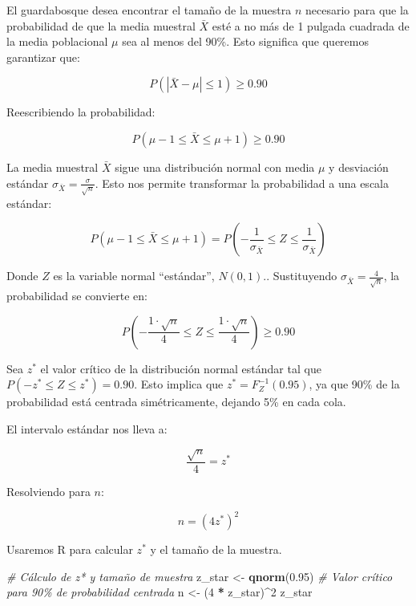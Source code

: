\documentclass[
]{article}
\newenvironment{Shaded}{\begin{snugshade}}{\end{snugshade}}
\newcommand{\CommentTok}[1]{\textcolor[rgb]{0.56,0.35,0.01}{\textit{#1}}}
\newcommand{\DecValTok}[1]{\textcolor[rgb]{0.00,0.00,0.81}{#1}}
\newcommand{\FloatTok}[1]{\textcolor[rgb]{0.00,0.00,0.81}{#1}}
\newcommand{\FunctionTok}[1]{\textcolor[rgb]{0.13,0.29,0.53}{\textbf{#1}}}
\newcommand{\NormalTok}[1]{#1}
\newcommand{\OtherTok}[1]{\textcolor[rgb]{0.56,0.35,0.01}{#1}}
\newcommand{\SpecialCharTok}[1]{\textcolor[rgb]{0.81,0.36,0.00}{\textbf{#1}}}
\begin{document}
El guardabosque desea encontrar el tamaño de la muestra \(n\) necesario para que la probabilidad de que la media muestral \(\bar{X}\) esté a no más de 1 pulgada cuadrada de la media poblacional \(\mu\) sea al menos del 90\%. Esto significa que queremos garantizar que:

\[
P(|\bar{X} - \mu| \leq 1) \geq 0.90
\]

Reescribiendo la probabilidad:

\[
P(\mu - 1 \leq \bar{X} \leq \mu + 1) \geq 0.90
\]

La media muestral \(\bar{X}\) sigue una distribución normal con media \(\mu\) y desviación estándar \(\sigma_{\bar{X}} = \frac{\sigma}{\sqrt{n}}\). Esto nos permite transformar la probabilidad a una escala estándar:

\[
P(\mu - 1 \leq \bar{X} \leq \mu + 1) = P\left(-\frac{1}{\sigma_{\bar{X}}} \leq Z \leq \frac{1}{\sigma_{\bar{X}}}\right)
\]

Donde \(Z\) es la variable normal ``estándar'', \(N(0,1)\).. Sustituyendo \(\sigma_{\bar{X}} = \frac{4}{\sqrt{n}}\), la probabilidad se convierte en:

\[
P\left(-\frac{1 \cdot \sqrt{n}}{4} \leq Z \leq \frac{1 \cdot \sqrt{n}}{4}\right) \geq 0.90
\]

Sea \(z^*\) el valor crítico de la distribución normal estándar tal que \(P(-z^* \leq Z \leq z^*) = 0.90\). Esto implica que \(z^* = F_Z^{-1}(0.95)\), ya que 90\% de la probabilidad está centrada simétricamente, dejando 5\% en cada cola.

El intervalo estándar nos lleva a:

\[
\frac{\sqrt{n}}{4} = z^*
\]

Resolviendo para \(n\):

\[
n = (4z^*)^2
\]

Usaremos R para calcular \(z^*\) y el tamaño de la muestra.

\begin{Shaded}
\begin{Highlighting}[]
\CommentTok{\# Cálculo de z* y tamaño de muestra}
\NormalTok{z\_star }\OtherTok{\textless{}{-}} \FunctionTok{qnorm}\NormalTok{(}\FloatTok{0.95}\NormalTok{) }\CommentTok{\# Valor crítico para 90\% de probabilidad centrada}
\NormalTok{n }\OtherTok{\textless{}{-}}\NormalTok{ (}\DecValTok{4} \SpecialCharTok{*}\NormalTok{ z\_star)}\SpecialCharTok{\^{}}\DecValTok{2}
\NormalTok{z\_star}
\end{Highlighting}
\end{Shaded}
\end{document}
